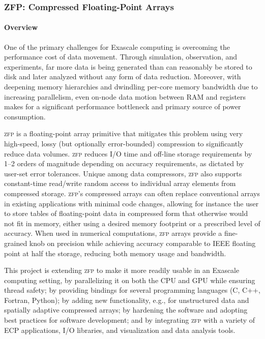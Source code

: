 \newcommand{\zfp}{\textsc{zfp}}

\subsubsection{ ZFP: Compressed Floating-Point Arrays}

\paragraph{Overview} 

One of the primary challenges for Exascale computing is overcoming the
performance cost of data movement.  Through simulation, observation, and
experiments, far more data is being generated than can reasonably be stored
to disk and later analyzed without any form of data reduction.  Moreover,
with deepening memory hierarchies and dwindling per-core memory bandwidth
due to increasing parallelism, even on-node data motion between RAM and
registers makes for a significant performance bottleneck and primary source
of power consumption.

{\zfp} is a floating-point array primitive that mitigates this problem using
very high-speed, lossy (but optionally error-bounded) compression to
significantly reduce data volumes.  {\zfp} reduces I/O time and off-line
storage requirements by 1--2 orders of magnitude depending on accuracy
requirements, as dictated by user-set error tolerances.  Unique among data
compressors, {\zfp} also supports constant-time read/write random access to
individual array elements from compressed storage.  {\zfp}'s compressed arrays
can often replace conventional arrays in existing applications with minimal
code changes, allowing for instance the user to store tables of floating-point
data in compressed form that otherwise would not fit in memory, either using
a desired memory footprint or a prescribed level of accuracy.  When used in
numerical computations, {\zfp} arrays provide a fine-grained knob on precision
while achieving accuracy comparable to IEEE floating point at half the
storage, reducing both memory usage and bandwidth.

This project is extending {\zfp} to make it more readily usable in an Exascale
computing setting, by parallelizing it on both the CPU and GPU while ensuring
thread safety; by providing bindings for several programming languages (C,
C++, Fortran, Python); by adding new functionality, e.g., for unstructured
data and spatially adaptive compressed arrays; by hardening the software and
adopting best practices for software development; and by integrating {\zfp}
with a variety of ECP applications, I/O libraries, and visualization and data
analysis tools.



